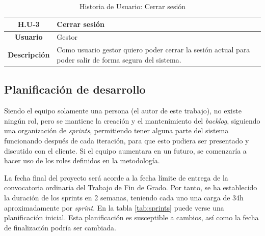 \begin{table}[!h]
	\begin{center}
		\begin{tabular}{|c|p{10cm}|}
		\hline \textbf{H.U-3} & Cerrar sesión \\ 
		\hline \textbf{Usuario} & Gestor \\ 
		\hline \textbf{Descripción} & Como usuario gestor quiero poder cerrar la sesión actual para poder salir de forma segura del sistema. \\ 
		\hline 
		\end{tabular}
		\caption{Historia de Usuario: Cerrar sesión}
		\label{tab:HU3}
	\end{center}
\end{table}

\subsection{Planificación de desarrollo}
Siendo el equipo solamente una persona (el autor de este trabajo), no existe ningún rol, pero se mantiene la creación y el mantenimiento del \textit{backlog}, siguiendo una organización de \textit{sprints}, permitiendo tener alguna parte del sistema funcionando después de cada iteración, para que esto pudiera ser presentado y discutido con el cliente. Si el equipo aumentara en un futuro, se comenzaría a hacer uso de los roles definidos en la metodología.

La fecha final del proyecto será acorde a la fecha límite de entrega de la convocatoria ordinaria del Trabajo de Fin de Grado. Por tanto, se ha establecido la duración de los sprints en 2 semanas, teniendo cada uno una carga de 34h aproximadamente por \textit{sprint}. En la tabla \ref{tab:sprints} puede verse una planificación inicial. Esta planificación es susceptible a cambios, así como la fecha de finalización podría ser cambiada.


